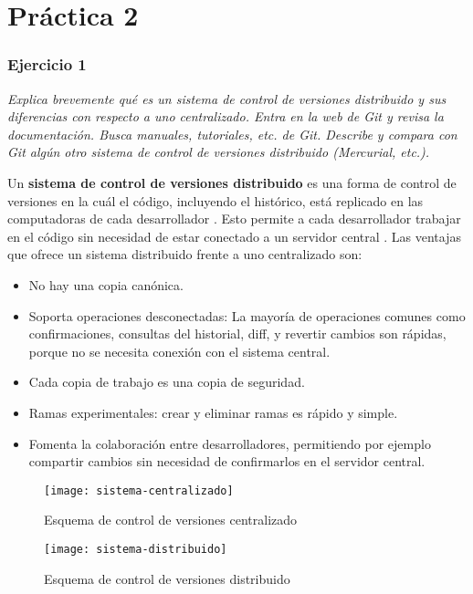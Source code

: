 \part{Práctica 2}
\setcounter{section}{0}
\section{Ejercicio 1}
\begin{center}
    \parbox{12cm}{\justify\textit{Explica brevemente qué es un sistema de control de versiones distribuido y sus diferencias con respecto a uno centralizado. Entra en la web de Git y revisa la documentación. Busca manuales, tutoriales, etc. de Git. Describe y compara con Git algún otro sistema de control de versiones distribuido (Mercurial, etc.).
    }}
\end{center}

Un \textbf{sistema de control de versiones distribuido} es una forma de control de versiones en la cuál el código, incluyendo el histórico, está replicado en las computadoras de cada desarrollador \cite{wikipedia_2020:Distributed_Version_Control}. Esto permite a cada desarrollador trabajar en el código sin necesidad de estar conectado a un servidor central \cite{juancarlosfernandez_2010}.
Las ventajas que ofrece un sistema distribuido frente a uno centralizado son:
\begin{itemize}
    \item No hay una copia canónica.
    \item Soporta operaciones desconectadas: La mayoría de operaciones comunes como confirmaciones, consultas del historial, diff, y revertir cambios son rápidas, porque no se necesita conexión con el sistema central.
    \item Cada copia de trabajo es una copia de seguridad.
    \item Ramas experimentales: crear y eliminar ramas es rápido y simple.
    \item Fomenta la colaboración entre desarrolladores, permitiendo por ejemplo compartir cambios sin necesidad de confirmarlos en el servidor central.
\end{itemize}

\begin{figure}[H]
    \centering
    \texttt{[image: sistema-centralizado]}
    \caption{Esquema de control de versiones centralizado}
    \label{fig:sistema-centralizado}
\end{figure}


\begin{figure}[H]
    \centering
    \texttt{[image: sistema-distribuido]}
    \caption{Esquema de control de versiones distribuido}
    \label{fig:sistema-distribuido}
\end{figure}



